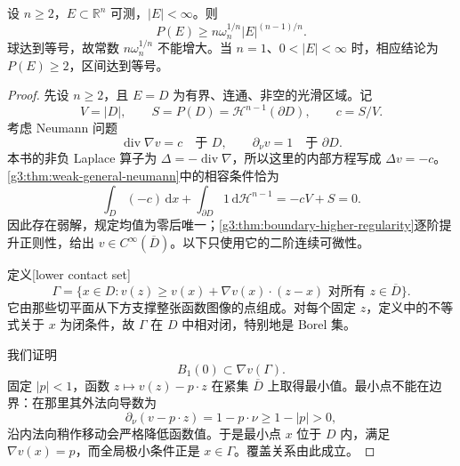 \begin{theorem}\label{g3:thm:sharp-euclidean-isoperimetric}
	设 \(n\ge2\)，\(E\subset\mathbb R^n\) 可测，\(|E|<\infty\)。则
	\begin{equation}\label{g3:eq:sharp-euclidean-isoperimetric}
		P(E)\ge n\omega_n^{1/n}|E|^{(n-1)/n}.
	\end{equation}
	球达到等号，故常数 \(n\omega_n^{1/n}\) 不能增大。当 \(n=1\)、\(0<|E|<\infty\) 时，相应结论为 \(P(E)\ge2\)，区间达到等号。
\end{theorem}
\begin{proof}
	先设 \(n\ge2\)，且 \(E=D\) 为有界、连通、非空的光滑区域。记
	\[
		V=|D|,\qquad S=P(D)=\mathcal H^{n-1}(\partial D),\qquad c=S/V.
	\]
	考虑 Neumann 问题
	\begin{equation}\label{g3:eq:isoperimetric-neumann}
		\operatorname{div}\nabla v=c\quad\text{于 }D,
		\qquad \partial_\nu v=1\quad\text{于 }\partial D.
	\end{equation}
	本书的非负 Laplace 算子为 \(\Delta=-\operatorname{div}\nabla\)，所以这里的内部方程写成 \(\Delta v=-c\)。\cref{g3:thm:weak-general-neumann}中的相容条件恰为
	\[
		\int_D(-c)\,\mathrm dx+\int_{\partial D}1\,\mathrm d\mathcal H^{n-1}=-cV+S=0.
	\]
	因此存在弱解，规定均值为零后唯一；\cref{g3:thm:boundary-higher-regularity}逐阶提升正则性，给出 \(v\in C^\infty(\overline D)\)。以下只使用它的二阶连续可微性。

	定义[lower contact set]
	\[
		\Gamma=\{x\in D:v(z)\ge v(x)+\nabla v(x)\cdot(z-x)
		\text{ 对所有 }z\in\overline D\}.
	\]
	它由那些切平面从下方支撑整张函数图像的点组成。对每个固定 \(z\)，定义中的不等式关于 \(x\) 为闭条件，故 \(\Gamma\) 在 \(D\) 中相对闭，特别地是 Borel 集。

	我们证明
	\begin{equation}\label{g3:eq:isoperimetric-gradient-cover}
		B_1(0)\subset\nabla v(\Gamma).
	\end{equation}
	固定 \(|p|<1\)，函数 \(z\mapsto v(z)-p\cdot z\) 在紧集 \(\overline D\) 上取得最小值。最小点不能在边界：在那里其外法向导数为
	\[
		\partial_\nu(v-p\cdot z)=1-p\cdot\nu\ge1-|p|>0,
	\]
	沿内法向稍作移动会严格降低函数值。于是最小点 \(x\) 位于 \(D\) 内，满足 \(\nabla v(x)=p\)，而全局极小条件正是 \(x\in\Gamma\)。覆盖关系由此成立。


\end{proof}
